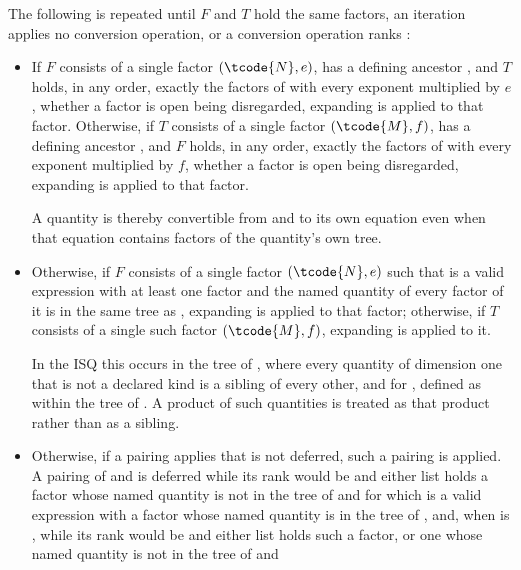 \pnum
The following is repeated until $F$ and $T$ hold the same factors,
an iteration applies no conversion operation, or a conversion operation ranks :
\begin{itemize}
\item
If $F$ consists of a single factor $(\tcode{N}, e)$,
 has a defining ancestor , and
$T$ holds, in any order, exactly the factors of 
with every exponent multiplied by $e$, whether a factor is open being disregarded,
expanding is applied to that factor.
Otherwise, if $T$ consists of a single factor $(\tcode{M}, f)$,
 has a defining ancestor , and
$F$ holds, in any order, exactly the factors of 
with every exponent multiplied by $f$, whether a factor is open being disregarded,
expanding is applied to that factor.
\begin{note}
A quantity is thereby convertible from and to its own equation
even when that equation contains factors of the quantity's own tree.
\end{note}
\item
Otherwise, if $F$ consists of a single factor $(\tcode{N}, e)$ such that
 is a valid expression with at least one factor and
the named quantity of every factor of it is in the same tree as ,
expanding is applied to that factor;
otherwise, if $T$ consists of a single such factor $(\tcode{M}, f)$, expanding is applied to it.
\begin{note}
In the ISQ this occurs in the tree of , where every quantity of dimension one
that is not a declared kind is a sibling of every other, and for ,
defined as  within the tree of .
A product of such quantities is treated as that product rather than as a sibling.
\end{note}
\item
Otherwise, if a pairing applies that is not deferred, such a pairing is applied.
A pairing of  and  is deferred while its rank would be  and
either list holds a factor whose named quantity  is not in the tree of  and
for which  is a valid expression with
a factor whose named quantity is in the tree of ,
and, when  is , while its rank would be  and either list holds such a factor,
or one whose named quantity  is not in the tree of  and

\end{itemize}

